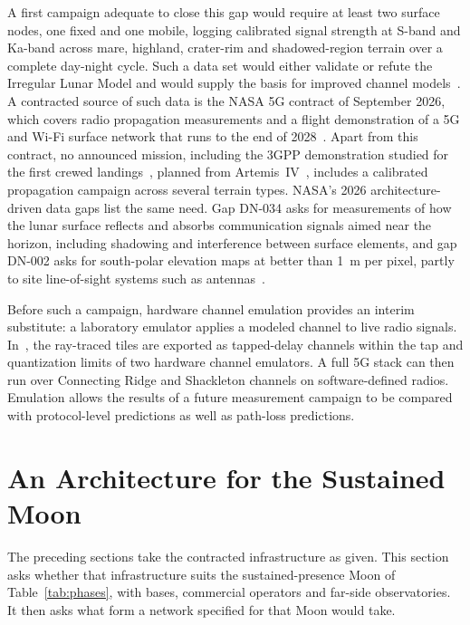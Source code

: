 \documentclass{IEEEoj}
\begin{document}
A first campaign adequate to close this gap would require at least two surface nodes, one fixed and one mobile, logging calibrated signal strength at S-band and Ka-band across mare, highland, crater-rim and shadowed-region terrain over a complete day-night cycle. Such a data set would either validate or refute the Irregular Lunar Model and would supply the basis for improved channel models~\cite{itu_p2170,zhu_channel_ray}. A contracted source of such data is the NASA 5G contract of September 2026, which covers radio propagation measurements and a flight demonstration of a 5G and Wi-Fi surface network that runs to the end of 2028~\cite{nasa_c26014}. Apart from this contract, no announced mission, including the 3GPP demonstration studied for the first crewed landings~\cite{nasa_gem_2026}, planned from Artemis~IV~\cite{nasa_art3_2026}, includes a calibrated propagation campaign across several terrain types. NASA's 2026 architecture-driven data gaps list the same need. Gap DN-034 asks for measurements of how the lunar surface reflects and absorbs communication signals aimed near the horizon, including shadowing and interference between surface elements, and gap DN-002 asks for south-polar elevation maps at better than \SI{1}{m} per pixel, partly to site line-of-sight systems such as antennas~\cite{nasa_datagaps2026}.


Before such a campaign, hardware channel emulation provides an interim substitute: a laboratory emulator applies a modeled channel to live radio signals. In~\cite{baena2027surface}, the ray-traced tiles are exported as tapped-delay channels within the tap and quantization limits of two hardware channel emulators. A full 5G stack can then run over Connecting Ridge and Shackleton channels on software-defined radios. Emulation allows the results of a future measurement campaign to be compared with protocol-level predictions as well as path-loss predictions.


\section{An Architecture for the Sustained Moon}
\label{sec:architecture}
The preceding sections take the contracted infrastructure as given. This section asks whether that infrastructure suits the sustained-presence Moon of Table~\ref{tab:phases}, with bases, commercial operators and far-side observatories. It then asks what form a network specified for that Moon would take. 
\end{document}

